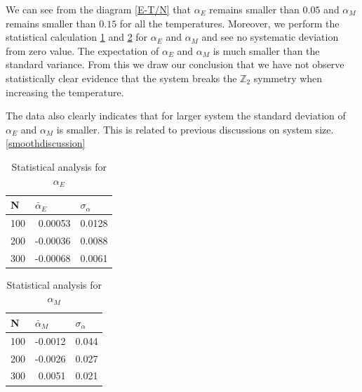\documentclass[11pt]{article}
\begin{document}
We can see from the diagram \ref{E-T/N} that $\alpha_E$ remains smaller than $0.05$ and $\alpha_M$ remains smaller than $0.15$ for all the temperatures. Moreover, we perform the statistical calculation \ref{tab:alphae} and \ref{tab:alpham} for $\alpha_E$ and $\alpha_M$ and see no systematic deviation from zero value. The expectation of $\alpha_E$ and $\alpha_M$ is much smaller than the standard variance. From this we draw our conclusion that we have not observe statistically clear evidence that the system breaks the $\mathbb{Z}_2$ symmetry when increasing the temperature.

The data also clearly indicates that for larger system the standard deviation of $\alpha_E$ and $\alpha_M$ is smaller. This is related to previous discussions on system size.\ref{smoothdiscussion}

\begin{table}[htbp]
  \centering
  \caption{Statistical analysis for $\alpha_E$}
    \begin{tabular}{|r|r|r|}
    \hline
    \multicolumn{1}{|l|}{N} & \multicolumn{1}{l|}{$\bar\alpha_E$} & \multicolumn{1}{l|}{$\sigma_{\alpha}$} \\
    \hline
    100  & 0.00053 & 0.0128 \\
    \hline
    200  & -0.00036 & 0.0088 \\
    \hline
    300  & -0.00068 & 0.0061 \\
    \hline
    \end{tabular}%
  \label{tab:alphae}%
\end{table}%

\begin{table}[htbp]
  \centering
  \caption{Statistical analysis for $\alpha_M$}
    \begin{tabular}{|r|r|r|}
    \hline
    \multicolumn{1}{|l|}{N} & \multicolumn{1}{l|}{$\bar\alpha_M$} & \multicolumn{1}{l|}{$\sigma_{\alpha}$} \\
    \hline
    100  & -0.0012 & 0.044 \\
    \hline
    200  & -0.0026 & 0.027 \\
    \hline
    300  & 0.0051 & 0.021 \\
    \hline
    \end{tabular}%
  \label{tab:alpham}%
\end{table}%
\end{document}
